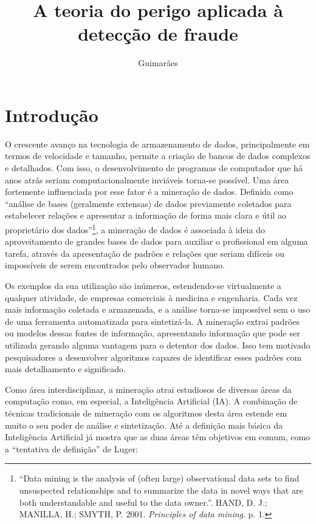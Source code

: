 \documentclass{iiufrgs}
\title{A teoria do perigo aplicada à detecção de fraude}
\author{Guimarães}{Bruno Barcarol}
\begin{document}
\maketitle
\newpage

\tableofcontents{}
\newpage

\chapter{Introdução}

O crescente avanço na tecnologia de armazenamento de dados, principalmente em termos de velocidade e tamanho, permite a criação de bancos de dados complexos e detalhados. Com isso, o desenvolvimento de programas de computador que há anos atrás seriam computacionalmente inviáveis torna-se possível. Uma área fortemente influenciada por esse fator é a mineração de dados. Definida como ``análise de bases (geralmente extensas) de dados previamente coletados para estabelecer relações e apresentar a informação de forma mais clara e útil ao proprietário dos dados''\footnote{``Data mining is the analysis of (often large) observational data sets to find unsuspected relationships and to summarize the data in novel ways that are both understandable and useful to the data owner.''. HAND, D. J.; MANILLA, H.; SMYTH, P. 2001. \emph{Principles of data mining}. p. 1.}, a mineração de dados é associada à ideia do aproveitamento de grandes bases de dados para auxiliar o profissional em alguma tarefa, através da apresentação de padrões e relações que seriam difíceis ou impossíveis de serem encontrados pelo observador humano.

Os exemplos da sua utilização são inúmeros, estendendo-se virtualmente a qualquer atividade, de empresas comerciais à medicina e engenharia. Cada vez mais informação coletada e armazenada, e a análise torna-se impossível sem o uso de uma ferramenta automatizada para sintetizá-la. A mineração extrai padrões ou modelos dessas fontes de informação, apresentando informação que pode ser utilizada gerando alguma vantagem para o detentor dos dados. Isso tem motivado pesquisadores a desenvolver algoritmos capazes de identificar esses padrões com mais detalhamento e significado.

Como área interdisciplinar, a mineração atrai estudiosos de diversas áreas da computação como, em especial, a Inteligência Artificial (IA). A combinação de técnicas tradicionais de mineração com os algoritmos desta área estende em muito o seu poder de análise e sintetização. Até a definição mais básica da Inteligência Artificial já mostra que as duas áreas têm objetivos em comum, como a ``tentativa de definição'' de Luger:
\end{document}
